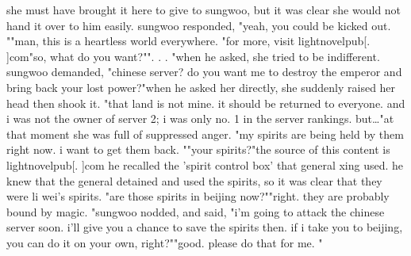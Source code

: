 she must have brought it here to give to sungwoo, but it was clear she would not hand it over to him easily.
sungwoo responded, "yeah, you could be kicked out.
""man, this is a heartless world everywhere.
"for more, visit lightnovelpub[.
]com"so, what do you want?"".
.
.
"when he asked, she tried to be indifferent.
 sungwoo demanded, "chinese server? do you want me to destroy the emperor and bring back your lost power?"when he asked her directly, she suddenly raised her head then shook it.
"that land is not mine.
 it should be returned to everyone.
 and i was not the owner of server 2; i was only no.
 1 in the server rankings.
 but…"at that moment she was full of suppressed anger.
"my spirits are being held by them right now.
 i want to get them back.
""your spirits?"the source of this content is lightnovelpub[.
]com he recalled the 'spirit control box' that general xing used.
 he knew that the general detained and used the spirits, so it was clear that they were li wei's spirits.
"are those spirits in beijing now?""right.
 they are probably bound by magic.
"sungwoo nodded, and said, "i'm going to attack the chinese server soon.
 i'll give you a chance to save the spirits then.
 if i take you to beijing, you can do it on your own, right?""good.
 please do that for me.
"

 